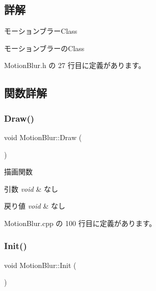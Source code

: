 \subsection{詳解}
モーションブラー\+Class 

モーションブラーの\+Class 

 Motion\+Blur.\+h の 27 行目に定義があります。



\subsection{関数詳解}
\mbox{\label{class_motion_blur_a8f3c39934e707c4325310873eea3ed45}} 
\subsubsection{\texorpdfstring{Draw()}{Draw()}}
{\footnotesize\ttfamily void Motion\+Blur\+::\+Draw (\begin{DoxyParamCaption}{ }\end{DoxyParamCaption})}



描画関数 


\begin{DoxyParams}{引数}
{\em void} & なし \\
\hline
\end{DoxyParams}

\begin{DoxyRetVals}{戻り値}
{\em void} & なし \\
\hline
\end{DoxyRetVals}


 Motion\+Blur.\+cpp の 100 行目に定義があります。

\mbox{\label{class_motion_blur_a93f61cc3a14ed681e026d286a51da059}} 
\subsubsection{\texorpdfstring{Init()}{Init()}}
{\footnotesize\ttfamily void Motion\+Blur\+::\+Init (\begin{DoxyParamCaption}{ }\end{DoxyParamCaption})}



